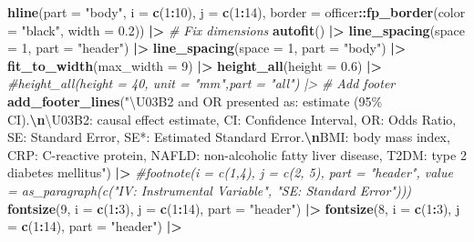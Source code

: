 \documentclass[
]{article}
\newenvironment{Shaded}{\begin{snugshade}}{\end{snugshade}}
\newcommand{\AttributeTok}[1]{\textcolor[rgb]{0.13,0.29,0.53}{#1}}
\newcommand{\CommentTok}[1]{\textcolor[rgb]{0.56,0.35,0.01}{\textit{#1}}}
\newcommand{\DecValTok}[1]{\textcolor[rgb]{0.00,0.00,0.81}{#1}}
\newcommand{\FloatTok}[1]{\textcolor[rgb]{0.00,0.00,0.81}{#1}}
\newcommand{\FunctionTok}[1]{\textcolor[rgb]{0.13,0.29,0.53}{\textbf{#1}}}
\newcommand{\NormalTok}[1]{#1}
\newcommand{\SpecialCharTok}[1]{\textcolor[rgb]{0.81,0.36,0.00}{\textbf{#1}}}
\newcommand{\StringTok}[1]{\textcolor[rgb]{0.31,0.60,0.02}{#1}}
\begin{document}
\begin{landscape}
\begin{Shaded}
\begin{Highlighting}[]
  \FunctionTok{hline}\NormalTok{(}\AttributeTok{part =} \StringTok{"body"}\NormalTok{, }\AttributeTok{i =} \FunctionTok{c}\NormalTok{(}\DecValTok{1}\SpecialCharTok{:}\DecValTok{10}\NormalTok{), }\AttributeTok{j =} \FunctionTok{c}\NormalTok{(}\DecValTok{1}\SpecialCharTok{:}\DecValTok{14}\NormalTok{), }\AttributeTok{border =}\NormalTok{ officer}\SpecialCharTok{::}\FunctionTok{fp\_border}\NormalTok{(}\AttributeTok{color =} \StringTok{"black"}\NormalTok{, }\AttributeTok{width =} \FloatTok{0.2}\NormalTok{)) }\SpecialCharTok{|\textgreater{}}
  \CommentTok{\# Fix dimensions}
  \FunctionTok{autofit}\NormalTok{() }\SpecialCharTok{|\textgreater{}}
  \FunctionTok{line\_spacing}\NormalTok{(}\AttributeTok{space =} \DecValTok{1}\NormalTok{, }\AttributeTok{part =} \StringTok{"header"}\NormalTok{) }\SpecialCharTok{|\textgreater{}}
  \FunctionTok{line\_spacing}\NormalTok{(}\AttributeTok{space =} \DecValTok{1}\NormalTok{, }\AttributeTok{part =} \StringTok{"body"}\NormalTok{) }\SpecialCharTok{|\textgreater{}}
  \FunctionTok{fit\_to\_width}\NormalTok{(}\AttributeTok{max\_width =} \DecValTok{9}\NormalTok{) }\SpecialCharTok{|\textgreater{}}
  \FunctionTok{height\_all}\NormalTok{(}\AttributeTok{height =} \FloatTok{0.6}\NormalTok{) }\SpecialCharTok{|\textgreater{}}
  \CommentTok{\#height\_all(height = 40, unit = "mm",part = "all") |\textgreater{}}
  \CommentTok{\# Add footer}
  \FunctionTok{add\_footer\_lines}\NormalTok{(}\StringTok{"\textbackslash{}U03B2 and OR presented as: estimate (95\% CI).}\SpecialCharTok{\textbackslash{}n}\StringTok{\textbackslash{}U03B2: causal effect estimate, CI: Confidence Interval, OR: Odds Ratio, SE: Standard Error, SE*: Estimated Standard Error.}\SpecialCharTok{\textbackslash{}n}\StringTok{BMI: body mass index, CRP: C{-}reactive protein, NAFLD: non{-}alcoholic fatty liver disease, T2DM: type 2 diabetes mellitus"}\NormalTok{) }\SpecialCharTok{|\textgreater{}}
  \CommentTok{\#footnote(i = c(1,4), j = c(2, 5), part = "header", value = as\_paragraph(c("IV: Instrumental Variable", "SE: Standard Error")))}
  \FunctionTok{fontsize}\NormalTok{(}\DecValTok{9}\NormalTok{, }\AttributeTok{i =} \FunctionTok{c}\NormalTok{(}\DecValTok{1}\SpecialCharTok{:}\DecValTok{3}\NormalTok{), }\AttributeTok{j =} \FunctionTok{c}\NormalTok{(}\DecValTok{1}\SpecialCharTok{:}\DecValTok{14}\NormalTok{), }\AttributeTok{part =} \StringTok{"header"}\NormalTok{) }\SpecialCharTok{|\textgreater{}}
  \FunctionTok{fontsize}\NormalTok{(}\DecValTok{8}\NormalTok{, }\AttributeTok{i =} \FunctionTok{c}\NormalTok{(}\DecValTok{1}\SpecialCharTok{:}\DecValTok{3}\NormalTok{), }\AttributeTok{j =} \FunctionTok{c}\NormalTok{(}\DecValTok{1}\SpecialCharTok{:}\DecValTok{14}\NormalTok{), }\AttributeTok{part =} \StringTok{"header"}\NormalTok{) }\SpecialCharTok{|\textgreater{}}

\end{Highlighting}
\end{Shaded}
\end{landscape}
\end{document}
